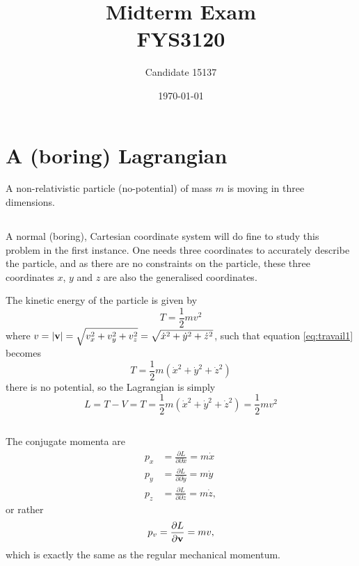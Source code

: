 \documentclass[11pt]{amsart}
\title[FYS3120 Midterm]{Midterm Exam\\
		\hrulefill \large{ FYS3120 } \hrulefill}
\author[15137]{Candidate 15137}
\date{\today}
\begin{document}
\maketitle

\section{A (boring) Lagrangian}
A non-relativistic particle (no-potential) of mass $m$ is moving in three dimensions.

\subsection{}
A normal (boring), Cartesian coordinate system will do fine to study this problem in the first instance. One needs three coordinates to accurately describe the particle, and as there are no constraints on the particle, these three coordinates $x$, $y$ and $z$ are also the generalised coordinates.

The kinetic energy of the particle is given by
\begin{equation}
\label{eq:travail1}
T = \frac{1}{2}mv^2
\end{equation}
where $v = \abs{\vb{v}} = \sqrt{v_x^2 + v_y^2 + v_z^2} = \sqrt{\dot{x}^2 + \dot{y}^2 + \dot{z}^2}$, such that equation \ref{eq:travail1} becomes
\begin{equation}
T = \frac{1}{2}m(\dot{x}^2 + \dot{y}^2 + \dot{z}^2)
\end{equation}
there is no potential, so the Lagrangian is simply
\begin{equation}
L = T - V = T = \frac{1}{2}m(\dot{x}^2 + \dot{y}^2 + \dot{z}^2) = \frac{1}{2}mv^2
\end{equation}

\subsection{}
The conjugate momenta are
\begin{align*}
p_x &= \frac{\partial L}{\partial \partial \dot{x}} = m\dot{x} \\
p_y &= \frac{\partial L}{\partial \partial \dot{y}} = m\dot{y} \\
p_z &= \frac{\partial L}{\partial \partial \dot{z}} = m\dot{z}, 
\end{align*}
or rather
\begin{equation}
p_v = \frac{\partial L}{\partial \vb{v}} = mv,
\end{equation}
which is exactly the same as the regular mechanical momentum.
\end{document}
